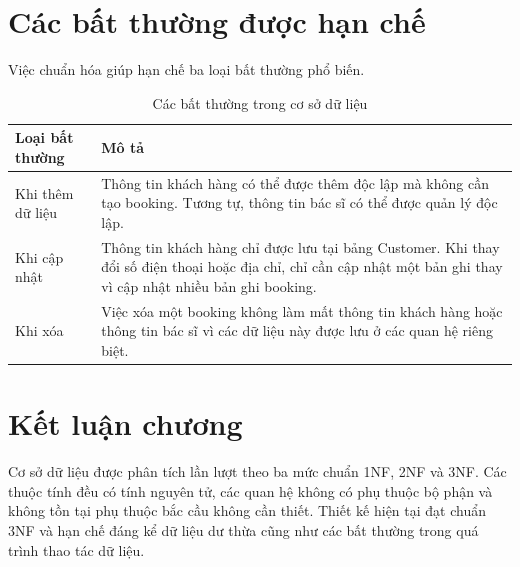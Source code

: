 \section{Các bất thường được hạn chế}

Việc chuẩn hóa giúp hạn chế ba loại bất thường phổ biến.

\begin{table}[htbp]
    \centering
    \caption{Các bất thường trong cơ sở dữ liệu}
    \label{tab:data_anomalies}
    \begin{tabularx}{\textwidth}{|p{4cm}|X|}
        \hline
        \textbf{Loại bất thường} & \textbf{Mô tả} \\ \hline

        Khi thêm dữ liệu &
        Thông tin khách hàng có thể được thêm độc lập mà không cần tạo booking. Tương tự, thông tin bác sĩ có thể được quản lý độc lập.
        \\ \hline

        Khi cập nhật &
        Thông tin khách hàng chỉ được lưu tại bảng Customer. Khi thay đổi số điện thoại hoặc địa chỉ, chỉ cần cập nhật một bản ghi thay vì cập nhật nhiều bản ghi booking.
        \\ \hline

        Khi xóa &
        Việc xóa một booking không làm mất thông tin khách hàng hoặc thông tin bác sĩ vì các dữ liệu này được lưu ở các quan hệ riêng biệt.
        \\ \hline

    \end{tabularx}
\end{table}

\section{Kết luận chương}

Cơ sở dữ liệu được phân tích lần lượt theo ba mức chuẩn 1NF, 2NF và 3NF. Các thuộc tính đều có tính nguyên tử, các quan hệ không có phụ thuộc bộ phận và không tồn tại phụ thuộc bắc cầu không cần thiết. Thiết kế hiện tại đạt chuẩn 3NF và hạn chế đáng kể dữ liệu dư thừa cũng như các bất thường trong quá trình thao tác dữ liệu.